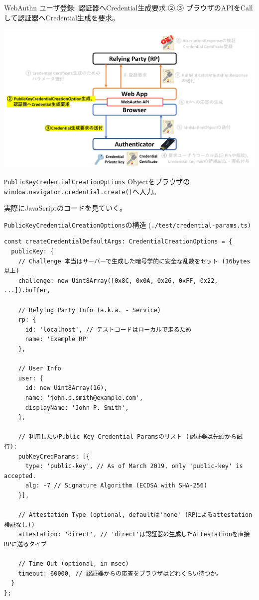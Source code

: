 \documentclass[12pt,dvipdfmx,uplatex]{beamer}
\begin{document}
\begin{frame}{WebAuthn ユーザ登録: 認証器へCredential生成要求}
②,③ ブラウザのAPIをCallして認証器へCredential生成を要求。
\begin{center}
\includegraphics[width=0.9\linewidth]{Figs/webauthn-registration2.pdf}
\end{center}
\texttt{PublicKeyCredentialCreationOptions} Objectをブラウザの\texttt{window.navigator.credential.create()}へ入力。
\end{frame}

\begin{frame}[fragile]
\small
実際にJavaScriptのコードを見ていく。
\begin{exampleblock}{\scriptsize \texttt{PublicKeyCredentialCreationOptions}の構造 (\texttt{./test/credential-params.ts)}}
{\tiny
\begin{verbatim}
const createCredentialDefaultArgs: CredentialCreationOptions = {
  publicKey: {
    // Challenge 本当はサーバーで生成した暗号学的に安全な乱数をセット (16bytes以上)
    challenge: new Uint8Array([0x8C, 0x0A, 0x26, 0xFF, 0x22, ...]).buffer,

    // Relying Party Info (a.k.a. - Service)
    rp: {
      id: 'localhost', // テストコードはローカルで走るため
      name: 'Example RP'
    },

    // User Info
    user: {
      id: new Uint8Array(16),
      name: 'john.p.smith@example.com',
      displayName: 'John P. Smith',
    },

    // 利用したいPublic Key Credential Paramsのリスト (認証器は先頭から試行):
    pubKeyCredParams: [{
      type: 'public-key', // As of March 2019, only 'public-key' is accepted.
      alg: -7 // Signature Algorithm (ECDSA with SHA-256)
    }],

    // Attestation Type (optional, defaultは'none' (RPによるattestation検証なし))
    attestation: 'direct', // 'direct'は認証器の生成したAttestationを直接RPに送るタイプ

    // Time Out (optional, in msec)
    timeout: 60000, // 認証器からの応答をブラウザはどれくらい待つか。
  }
};
\end{verbatim}
}
\end{exampleblock}
\end{frame}
\end{document}
